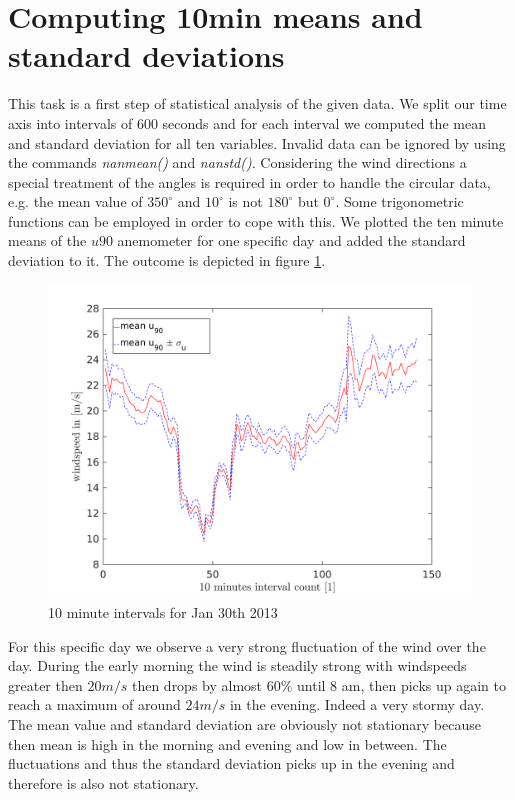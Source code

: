 \documentclass[10pt]{article}
\begin{document}
\section{Computing 10min means and standard deviations}
This task is a first step of statistical analysis of the given data. We split our time axis into intervals of 600 seconds and for each interval we computed the mean and standard deviation for all ten variables. Invalid data can be ignored by using the commands \textit{nanmean()} and \textit{nanstd()}. Considering the wind directions a special treatment of the angles is required in order to handle the circular data, e.g. the mean value of $350^{\circ}$ and $10^{\circ}$ is not $180^{\circ}$ but $0^{\circ}$. Some trigonometric functions can be employed in order to cope with this. We plotted the ten minute means of the $u90$ anemometer for one specific day and added the standard deviation to it. The outcome is depicted in figure \ref{fig:means}.\\
\begin{figure}[htb!]
  \centering
  \includegraphics[width=1\linewidth]{../Plots/mean_interval_withstd.png}
  \caption{10 minute intervals for Jan 30th 2013}
  \label{fig:means}
\end{figure}

For this specific day we observe a very strong fluctuation of the wind over the day. During the early morning the wind is steadily strong with windspeeds greater then $20 m/s$ then drops by almost $60 \%$ until 8 am, then picks up again to reach a maximum of around $24 m/s$ in the evening. Indeed a very stormy day. The mean value and standard deviation are obviously not stationary because then mean is high in the morning and evening and low in between. The fluctuations and thus the standard deviation picks up in the evening and therefore is also not stationary.
\end{document}
